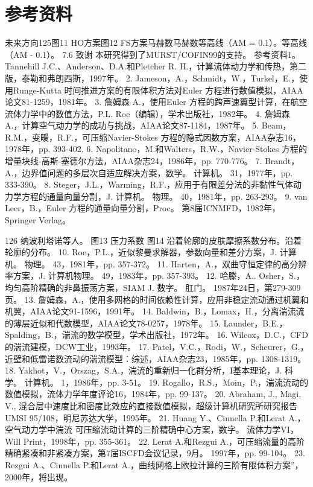 \documentclass[UTF8,11pt,a4paper,openany,fontset=fandol]{ctexbook}
\begin{document}
\section{参考资料}
未来方向125图11 HO方案图12 FS方案马赫数马赫数等高线（AM = 0.1）。等高线（AM - 0.1）。 7.6 致谢 本研究得到了MURST/COFIN99的支持。 参考资料1。 Tannehill J.C.、Anderson、D.A.和Pletcher R. H.，计算流体动力学和传热，第二版，泰勒和弗朗西斯，1997年。 2. Jameson，A.，Schmidt，W.，Turkel，E.，使用Runge-Kutta 时间推进方案的有限体积方法对Euler 方程进行数值模拟，AIAA论文81-1259，1981年。 3. 詹姆森 A.，使用Euler 方程的跨声速翼型计算，在航空流体力学中的数值方法，P.L. Roe（编辑），学术出版社，1982年。 4. 詹姆森 A.，计算空气动力学的成功与挑战，AIAA论文87-1184，1987年。 5. Beam，R.M.，变暖，R.F.，可压缩Navier-Stokes 方程的隐式因数方案，AIAA杂志16，1978年，pp. 393-402. 6. Napolitano，M.和Walters，R.W.，Navier-Stokes 方程的增量块线-高斯-塞德尔方法，AIAA杂志24，1986年，pp. 770-776。 7. Brandt，A.，边界值问题的多层次自适应解决方案，数学。 计算机。 31，1977年，pp. 333-390。 8. Steger，J.L.，Warming，R.F.，应用于有限差分法的非黏性气体动力学方程的通量向量分割，J. 计算机。 物理。 40，1981年，pp. 263-293。 9. van Leer，B.，Euler 方程的通量向量分割，Proc。 第8届ICNMFD，1982年，Springer Verlag。

126 纳波利塔诺等人。 图13 压力系数 图14 沿着轮廓的皮肤摩擦系数分布。沿着轮廓的分布。 10. Roe，P.L.，近似黎曼求解器，参数向量和差分方案，J. 计算机。 物理。 43，1981年，pp. 357-372。 11. Harten，A.，双曲守恒定律的高分辨率方案，J. 计算机物理。 49，1983年，pp. 357-393。 12. 哈滕，A.. Osher，S.，均匀高阶精确的非鼻振荡方案，SIAM J. 数字。 肛门。 1987年24日，第279-309页。 13. 詹姆森，A.，使用多网格的时间依赖性计算，应用非稳定流动通过机翼和机翼，AIAA论文91-1596，1991年。 14. Baldwin，B.，Lomax，H.，分离湍流流的薄层近似和代数模型，AIAA论文78-0257，1978年。 15. Launder，B.E.，Spalding，B.，湍流的数学模型，学术出版社，1972年。 16. Wilcox，D.C.，CFD的湍流建模，DCW工业，1993年。 17. Patel，V.C.，Rodi，W.，Scheurer，G.，近壁和低雷诺数流动的湍流模型：综述，AIAA杂志23，1985年，pp. 1308-1319。 18. Yakhot，V.，Orszag，S.A.，湍流的重新归一化群分析，I基本理论，J. 科学。 计算机。 1，1986年，pp. 3-51。 19. Rogallo，R.S.，Moin，P.，湍流流动的数值模拟，流体力学年度评论16，1984年，pp. 99-137。 20. Abraham, J., Magi, V., 混合层中速度比和密度比效应的直接数值模拟，超级计算机研究所研究报告UMSI 95/108，明尼苏达大学，1995年。 21. Huang Y.、Cinnella P.和Lerat A.，空气动力学中湍流 可压缩流动计算的三阶精确中心方案，数字。 流体力学VI，Will Print，1998年，pp. 355-361。 22. Lerat A.和Rezgui A.，可压缩流量的高阶精确紧凑和非紧凑方案，第7届ISCFD会议记录，9月。 1997年，pp. 99-104。 23. Rezgui A.、Cinnella P.和Lerat A.，曲线网格上欧拉计算的三阶有限体积方案”，2000年，将出现。
\end{document}
